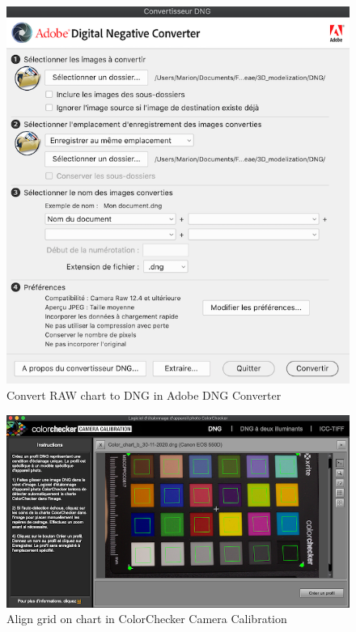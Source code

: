 \documentclass[
]{book}
\begin{document}
\begin{figure}
\hypertarget{adobe_dng}{%
\centering
\includegraphics[width=1\textwidth,height=\textheight]{Figures/AdobeDNGConverter.png}
\caption{Convert RAW chart to DNG in Adobe DNG
Converter}\label{adobe_dng}
}
\end{figure}

\begin{figure}
\hypertarget{color_checker_camera_calibration}{%
\centering
\includegraphics[width=1\textwidth,height=\textheight]{Figures/ColorChecker_camera_calibration.png}
\caption{Align grid on chart in ColorChecker Camera
Calibration}\label{color_checker_camera_calibration}
}
\end{figure}
\end{document}
